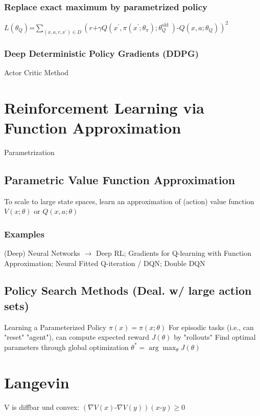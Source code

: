 \documentclass[a4paper, 11pt, landscape]{article}
\begin{document}
\begin{multicols*}{3}
\subsubsection{Replace exact maximum by parametrized policy}
$L\left(\theta_{Q}\right)\text{=}\sum_{\left(x, a, r, x^{\prime}\right) \in D}\left(r\text{+}\gamma Q\left(x^{\prime}, \pi\left(x^{\prime} ; \theta_{\pi}\right) ; \theta_{Q}^{\text {old }}\right)\text{-}Q\left(x, a ; \theta_{Q}\right)\right)^{2}$

\subsubsection{Deep Deterministic Policy Gradients (DDPG)}
Actor Critic Method

\section{Reinforcement Learning via Function Approximation}
Parametrization

\subsection{Parametric Value Function Approximation}
To scale to large state spaces, learn an approximation of (action) value function $V(x;\theta)$ or $Q(x,a;\theta)$

\subsubsection{Examples}
(Deep) Neural Networks $\rightarrow$ Deep RL; Gradients for Q-learning with Function Approximation; Neural Fitted Q-iteration / DQN; Double DQN

\subsection{Policy Search Methods (Deal. w/ large action sets)}
Learning a Parameterized Policy $\pi(x) = \pi(x;\theta)$
\newline For episodic tasks (i.e., can "reset" "agent"), can compute expected reward $J(\theta)$ by "rollouts"
\newline Find optimal parameters through global optimization
$\theta^{*}=\arg \max _{\theta} J(\theta)$

\section{Langevin}
V is diffbar und convex: $(\nabla V(x)\text{-}\nabla V(y))(x\text{-}y)\geq 0$

\raggedcolumns
\end{multicols*}
\end{document}
